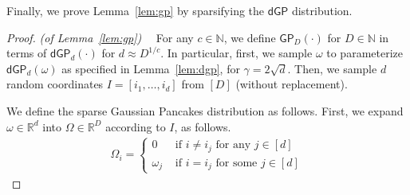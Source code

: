 \documentclass[preprint,11pt]{elsarticle}
\newcommand{\Nbb}{\mathbb{N}}
\newcommand{\Rbb}{\mathbb{R}}
\newcommand{\GP}{\mathsf{GP}}
\newcommand{\dGP}{\mathsf{dGP}}
\begin{document}
Finally, we prove Lemma~\ref{lem:gp} by sparsifying the $\dGP$ distribution.
\begin{proof} \emph{(of Lemma~\ref{lem:gp})}~~
For any $c \in \Nbb$, we define $\GP_D(\cdot)$ for $D \in \Nbb$ in terms of $\dGP_d(\cdot)$ for $d \approx D^{1/c}$.
In particular, first, we sample $\omega$ to parameterize $\dGP_d(\omega)$ as specified in Lemma~\ref{lem:dgp}, for $\gamma = 2\sqrt{d}$.
Then, we sample $d$ random coordinates $I = [i_1,\hdots,i_d]$ from $[D]$ (without replacement).

We define the sparse Gaussian Pancakes distribution as follows.
First, we expand $\omega \in \Rbb^d$ into $\Omega \in \Rbb^D$ according to $I$, as follows.
\begin{gather*}
    \Omega_i = \begin{cases} 0 & \textrm{ if } i \neq i_j \textrm{ for any } j \in [d]\\
    \omega_j & \textrm{ if } i = i_j \textrm{ for some } j \in [d]
    \end{cases}
\end{gather*}
\end{proof}

\newpage



\end{document}
